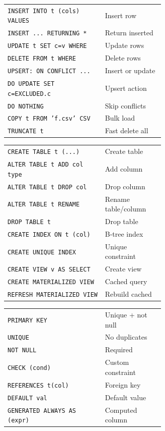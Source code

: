 \documentclass[10pt]{extarticle}
\begin{document}
\begin{multicols}{2}
\begin{tabularx}{\linewidth}{@{}>{\raggedright\arraybackslash}p{0.62\linewidth}@{\enspace}Y@{}}
\texttt{INSERT INTO t (cols) VALUES} & Insert row \\
\texttt{INSERT ... RETURNING *}     & Return inserted \\
\texttt{UPDATE t SET c=v WHERE}     & Update rows \\
\texttt{DELETE FROM t WHERE}        & Delete rows \\
\texttt{UPSERT: ON CONFLICT ...}   & Insert or update \\
\texttt{DO UPDATE SET c=EXCLUDED.c} & Upsert action \\
\texttt{DO NOTHING}                  & Skip conflicts \\
\texttt{COPY t FROM 'f.csv' CSV}   & Bulk load \\
\texttt{TRUNCATE t}                  & Fast delete all \\
\end{tabularx}

\begin{tabularx}{\linewidth}{@{}>{\raggedright\arraybackslash}p{0.62\linewidth}@{\enspace}Y@{}}
\texttt{CREATE TABLE t (...)}       & Create table \\
\texttt{ALTER TABLE t ADD col type} & Add column \\
\texttt{ALTER TABLE t DROP col}     & Drop column \\
\texttt{ALTER TABLE t RENAME}       & Rename table/column \\
\texttt{DROP TABLE t}               & Drop table \\
\texttt{CREATE INDEX ON t (col)}    & B-tree index \\
\texttt{CREATE UNIQUE INDEX}        & Unique constraint \\
\texttt{CREATE VIEW v AS SELECT}   & Create view \\
\texttt{CREATE MATERIALIZED VIEW}  & Cached query \\
\texttt{REFRESH MATERIALIZED VIEW} & Rebuild cached \\
\end{tabularx}

\begin{tabularx}{\linewidth}{@{}>{\raggedright\arraybackslash}p{0.62\linewidth}@{\enspace}Y@{}}
\texttt{PRIMARY KEY}                 & Unique + not null \\
\texttt{UNIQUE}                      & No duplicates \\
\texttt{NOT NULL}                    & Required \\
\texttt{CHECK (cond)}               & Custom constraint \\
\texttt{REFERENCES t(col)}          & Foreign key \\
\texttt{DEFAULT val}                 & Default value \\
\texttt{GENERATED ALWAYS AS (expr)} & Computed column \\
\end{tabularx}

\end{multicols}
\end{document}
